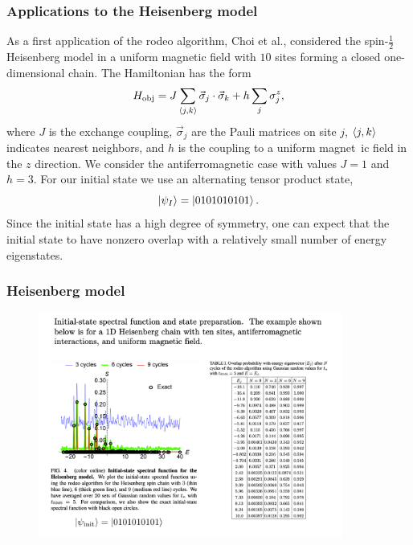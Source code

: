 \documentclass{beamer}
\begin{document}
\begin{frame}
\frametitle{Applications to the Heisenberg model}
As a first application of the rodeo algorithm, Choi et al., considered the spin-$\tfrac{1}{2}$ Heisenberg model in a uniform magnetic field with $10$ sites forming a
closed one-dimensional chain.  The Hamiltonian has the form
\begin{equation*}
    H_{\rm obj} = J \sum_{\braket{j,k}} \vec{\sigma}_j\cdot \vec{\sigma}_k + h \sum_{j} \sigma^z_j,
\end{equation*}
where $J$ is the exchange coupling, $\vec{\sigma}_j$ are the Pauli matrices on site $j$, $\braket{j,k}$ indicates nearest neighbors, and $h$ is the coupling to a uniform magnet\
ic field in the $z$ direction.  We consider the antiferromagnetic case with values $J=1$ and $h=3$. For our initial state we use an alternating tensor product state,
\begin{equation*}
    \ket{\psi_I} = \ket{0101010101}.
\end{equation*}
Since the initial state has a high degree of symmetry, one can expect that the initial state to have nonzero overlap with a relatively small number of energy eigenstates.

\end{frame}

\begin{frame}
\frametitle{Heisenberg model}
\begin{figure}
\centering
\includegraphics[width=10.0cm]{rodeofigs/rodeo6.png}
\label{Heisenberg_spectrum}
\end{figure} 

\end{frame}
\end{document}
